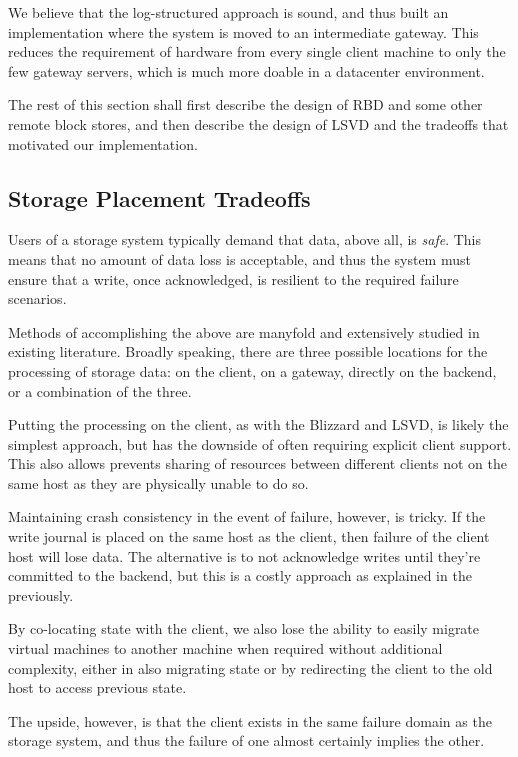 We believe that the log-structured approach is sound, and thus built an
implementation where the system is moved to an intermediate gateway. This
reduces the requirement of hardware from every single client machine to only the
few gateway servers, which is much more doable in a datacenter environment.

The rest of this section shall first describe the design of RBD and some other
remote block stores, and then describe the design of LSVD and the tradeoffs
that motivated our implementation.

\subsection{Storage Placement Tradeoffs}

Users of a storage system typically demand that data, above all, is
\textit{safe}.  This means that no amount of data loss is acceptable, and thus
the system must ensure that a write, once acknowledged, is resilient to the
required failure scenarios.

Methods of accomplishing the above are manyfold and extensively studied in
existing literature. Broadly speaking, there are three possible locations for
the processing of storage data: on the client, on a gateway, directly on the
backend, or a combination of the three.

Putting the processing on the client, as with the Blizzard and LSVD, is likely
the simplest approach, but has the downside of often requiring explicit client
support. This also allows prevents sharing of resources between different
clients not on the same host as they are physically unable to do so.

Maintaining crash consistency in the event of failure, however, is tricky. If
the write journal is placed on the same host as the client, then failure of the
client host will lose data. The alternative is to not acknowledge writes until
they're committed to the backend, but this is a costly approach as explained in
the previously.

By co-locating state with the client, we also lose the ability to easily migrate
virtual machines to another machine when required without additional complexity,
either in also migrating state or by redirecting the client to the old host
to access previous state.

The upside, however, is that the client exists in the same failure domain as
the storage system, and thus the failure of one almost certainly implies the
other. 

